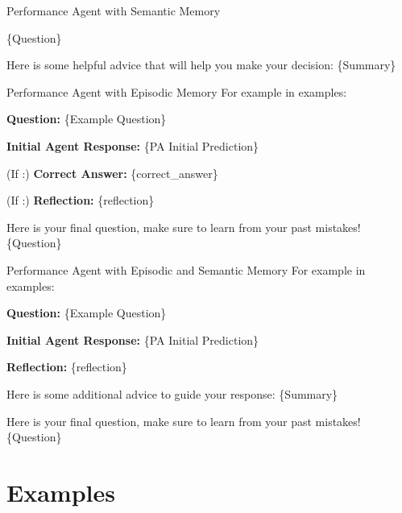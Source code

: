 \begin{promptbox}{Performance Agent with Semantic Memory} 
\small

\{Question\}

Here is some helpful advice that will help you make your decision: \{Summary\}
\end{promptbox}

\begin{promptbox}{Performance Agent with Episodic Memory} 
\small
For example in examples:

    \quad \textbf{Question:} \{Example Question\}
    
    \quad \textbf{Initial Agent Response:} \{PA Initial Prediction\}

    \quad (If \EPLABEL{}:) \textbf{Correct Answer:} \{correct\_answer\}

    \quad (If \EPCRIT{}:) \textbf{Reflection:} \{reflection\}
    
    
Here is your final question, make sure to learn from your past mistakes! \{Question\}
\end{promptbox}

\begin{promptbox}{Performance Agent with Episodic and Semantic Memory} 
\small
For example in examples:

    \quad \textbf{Question:} \{Example Question\}
    
    \quad \textbf{Initial Agent Response:} \{PA Initial Prediction\}

    \quad \textbf{Reflection:} \{reflection\}
    
Here is some additional advice to guide your response: \{Summary\} 

Here is your final question, make sure to learn from your past mistakes! \{Question\}

\end{promptbox}

\section{Examples}
\label{appendix_examples}


